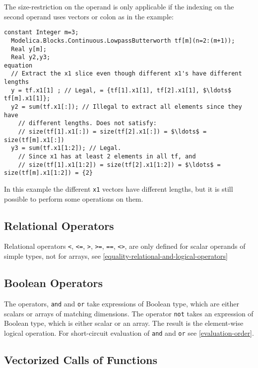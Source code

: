 \begin{example}
The size-restriction on the operand is only applicable
if the indexing on the second operand uses vectors or colon as in the
example:
\begin{lstlisting}[language=modelica,mathescape=true]
  constant Integer m=3;
  Modelica.Blocks.Continuous.LowpassButterworth tf[m](n=2:(m+1));
  Real y[m];
  Real y2,y3;
equation
  // Extract the x1 slice even though different x1's have different lengths
  y = tf.x1[1] ; // Legal, = {tf[1].x1[1], tf[2].x1[1], $\ldots$ tf[m].x1[1]};
  y2 = sum(tf.x1[:]); // Illegal to extract all elements since they have
    // different lengths. Does not satisfy:
    // size(tf[1].x1[:]) = size(tf[2].x1[:]) = $\ldots$ = size(tf[m].x1[:])
  y3 = sum(tf.x1[1:2]); // Legal.
    // Since x1 has at least 2 elements in all tf, and
    // size(tf[1].x1[1:2]) = size(tf[2].x1[1:2]) = $\ldots$ = size(tf[m].x1[1:2]) = {2}
\end{lstlisting}
In this example the different \lstinline!x1! vectors have different lengths,
but it is still possible to perform some operations on them.
\end{example}

\subsection{Relational Operators}

Relational operators \lstinline!<!, \lstinline!<=!, \lstinline!>!,
\lstinline!>=!, \lstinline!==!, \lstinline!<>!, are only defined for
scalar operands of simple types, not for arrays, see \autoref{equality-relational-and-logical-operators}

\subsection{Boolean Operators}

The operators, \lstinline!and! and \lstinline!or! take expressions of Boolean type, which are
either scalars or arrays of matching dimensions. The operator \lstinline!not! takes
an expression of Boolean type, which is either scalar or an array. The
result is the element-wise logical operation. For short-circuit
evaluation of \lstinline!and! and \lstinline!or! see \autoref{evaluation-order}.

\subsection{Vectorized Calls of Functions}

